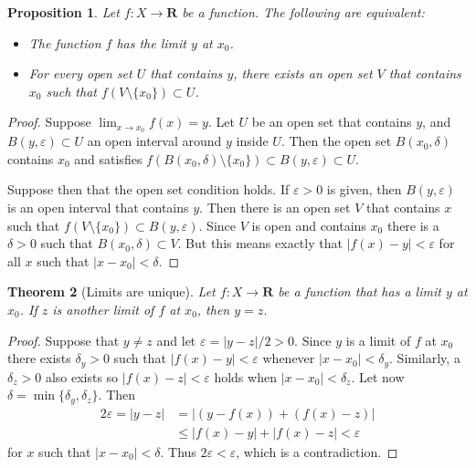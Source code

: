 \documentclass[11pt]{article}
\newtheorem{theo}{Theorem}
\newtheorem{prop}[theo]{Proposition}
\theoremstyle{definition}
\def\eps{\varepsilon}
\def\RR{\mathbf{R}}
\begin{document}
\begin{prop}
Let $f : X \to \RR$ be a function.
The following are equivalent:
\begin{itemize}
\item
The function $f$ has the limit $y$ at $x_0$.

\item
For every open set $U$ that contains $y$, there exists an open set $V$ that
contains $x_0$ such that $f(V \setminus \{ x_0 \}) \subset U$.
\end{itemize}
\end{prop}


\begin{proof}
Suppose $\lim_{x \to x_0} f(x) = y$.
Let $U$ be an open set that contains $y$, and $B(y,\eps) \subset U$ an open
interval around $y$ inside $U$.
Then the open set $B(x_0, \delta)$ contains $x_0$ and satisfies $f(B(x_0,
\delta) \setminus \{x_0\}) \subset B(y, \eps) \subset U$.

Suppose then that the open set condition holds.
If $\eps > 0$ is given, then $B(y, \eps)$ is an open interval that contains $y$.
Then there is an open set $V$ that contains $x$ such that $f(V \setminus
\{x_0\}) \subset B(y, \eps)$.
Since $V$ is open and contains $x_0$ there is a $\delta > 0$ such that $B(x_0,
\delta) \subset V$.
But this means exactly that $|f(x) - y| < \eps$ for all $x$ such that $|x -
x_0| < \delta$.
\end{proof}


\begin{theo}[Limits are unique]
Let $f : X \to \RR$ be a function that has a limit $y$ at $x_0$.
If $z$ is another limit of $f$ at $x_0$, then $y = z$.
\end{theo}

\begin{proof}
Suppose that $y \not= z$ and let $\eps = |y - z|/2 > 0$.
Since $y$ is a limit of $f$ at $x_0$ there exists $\delta_y > 0$ such that
$|f(x) - y| < \eps$ whenever $|x - x_0| < \delta_y$.
Similarly, a $\delta_z > 0$ also exists so $|f(x) - z| < \eps$ holds when
$|x - x_0| < \delta_z$.
Let now $\delta = \min\{\delta_y, \delta_z\}$.
Then
\begin{align*}
2\eps = |y - z| 
&= |(y - f(x)) + (f(x) - z)| 
\\
&\leq |f(x) - y| + |f(x) - z|
< \eps
\end{align*}
for $x$ such that $|x - x_0| < \delta$.
Thus $2 \eps < \eps$, which is a contradiction.
\end{proof}
\end{document}
